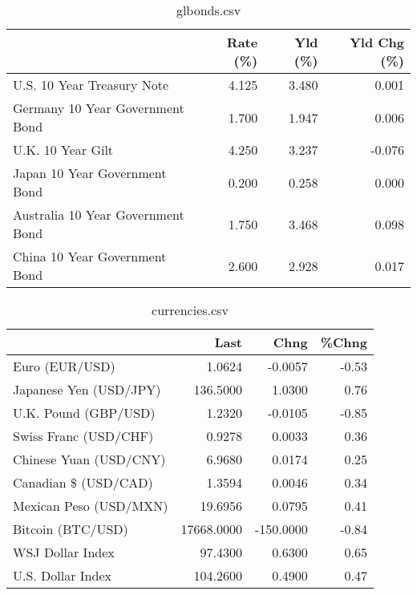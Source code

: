 \documentclass{article}%
\begin{document}
%


\begin{table}[htbp]%
\caption{glbonds.csv}%
\centering%
\begin{adjustbox}{width=1\textwidth}%
\begin{tabular}{lrrr}
\toprule
                                  &  Rate (\%) &  Yld (\%) &  Yld Chg (\%) \\
\midrule
       U.S. 10 Year Treasury Note &     4.125 &    3.480 &        0.001 \\
  Germany 10 Year Government Bond &     1.700 &    1.947 &        0.006 \\
                U.K. 10 Year Gilt &     4.250 &    3.237 &       -0.076 \\
    Japan 10 Year Government Bond &     0.200 &    0.258 &        0.000 \\
Australia 10 Year Government Bond &     1.750 &    3.468 &        0.098 \\
    China 10 Year Government Bond &     2.600 &    2.928 &        0.017 \\
\bottomrule
\end{tabular}
%
\end{adjustbox}%
\end{table}

%


\begin{table}[htbp]%
\caption{currencies.csv}%
\centering%
\begin{adjustbox}{width=1\textwidth}%
\begin{tabular}{lrrr}
\toprule
                       &       Last &      Chng &  \%Chng \\
\midrule
        Euro (EUR/USD) &     1.0624 &   -0.0057 &  -0.53 \\
Japanese Yen (USD/JPY) &   136.5000 &    1.0300 &   0.76 \\
  U.K. Pound (GBP/USD) &     1.2320 &   -0.0105 &  -0.85 \\
 Swiss Franc (USD/CHF) &     0.9278 &    0.0033 &   0.36 \\
Chinese Yuan (USD/CNY) &     6.9680 &    0.0174 &   0.25 \\
  Canadian \$ (USD/CAD) &     1.3594 &    0.0046 &   0.34 \\
Mexican Peso (USD/MXN) &    19.6956 &    0.0795 &   0.41 \\
     Bitcoin (BTC/USD) & 17668.0000 & -150.0000 &  -0.84 \\
      WSJ Dollar Index &    97.4300 &    0.6300 &   0.65 \\
     U.S. Dollar Index &   104.2600 &    0.4900 &   0.47 \\
\bottomrule
\end{tabular}
%
\end{adjustbox}%
\end{table}

%
\end{document}

